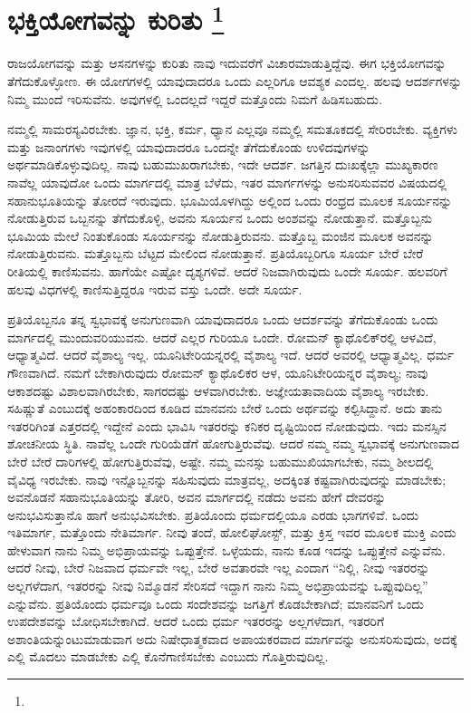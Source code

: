 
\chapter[ಭಕ್ತಿಯೋಗವನ್ನು ಕುರಿತು ]{ಭಕ್ತಿಯೋಗವನ್ನು ಕುರಿತು \protect\footnote{}}

ರಾಜಯೋಗವನ್ನು ಮತ್ತು ಆಸನಗಳನ್ನು ಕುರಿತು ನಾವು ಇದುವರೆಗೆ ವಿಚಾರಮಾಡುತ್ತಿದ್ದೆವು. ಈಗ ಭಕ್ತಿಯೋಗವನ್ನು ತೆಗೆದುಕೊಳ್ಳೋಣ. ಈ ಯೋಗಗಳಲ್ಲಿ ಯಾವುದಾದರೂ ಒಂದು ಎಲ್ಲರಿಗೂ ಆವಶ್ಯಕ ಎಂದಲ್ಲ. ಹಲವು ಆದರ್ಶಗಳನ್ನು ನಿಮ್ಮ ಮುಂದೆ ಇರಿಸುವೆನು. ಅವುಗಳಲ್ಲಿ ಒಂದಲ್ಲದೆ ಇದ್ದರೆ ಮತ್ತೊಂದು ನಿಮಗೆ ಹಿಡಿಸಬಹುದು.

\vskip 6pt

ನಮ್ಮಲ್ಲಿ ಸಾಮರಸ್ಯವಿರಬೇಕು. ಜ್ಞಾನ, ಭಕ್ತಿ, ಕರ್ಮ, ಧ್ಯಾನ ಎಲ್ಲವೂ ನಮ್ಮಲ್ಲಿ ಸಮ\break ತೂಕದಲ್ಲಿ ಸೇರಿರಬೇಕು. ವ್ಯಕ್ತಿಗಳು ಮತ್ತು ಜನಾಂಗಗಳು ಇವುಗಳಲ್ಲಿ ಯಾವುದಾದರೂ ಒಂದನ್ನೇ ತೆಗೆದುಕೊಂಡು ಉಳಿದವುಗಳನ್ನು ಅರ್ಥಮಾಡಿಕೊಳ್ಳುವುದಿಲ್ಲ. ನಾವು ಬಹು\break ಮುಖರಾಗಬೇಕು, ಇದೇ ಆದರ್ಶ. ಜಗತ್ತಿನ ದುಃಖಕ್ಕೆಲ್ಲಾ ಮುಖ್ಯಕಾರಣ ನಾವೆಲ್ಲ ಯಾವುದೋ ಒಂದು ಮಾರ್ಗದಲ್ಲಿ ಮಾತ್ರ ಬೆಳೆದು, ಇತರ ಮಾರ್ಗಗಳನ್ನು ಅನುಸರಿಸು\break ವವರ ವಿಷಯದಲ್ಲಿ ಸಹಾನುಭೂತಿಯನ್ನು ತೋರದೆ ಇರುವುದು. ಭೂಮಿಯೊಳಗಿದ್ದು ಅಲ್ಲಿಂದ ಒಂದು ರಂಧ್ರದ ಮೂಲಕ ಸೂರ್ಯನನ್ನು ನೋಡುತ್ತಿರುವ ಒಬ್ಬನನ್ನು ತೆಗೆದುಕೊಳ್ಳಿ, ಅವನು ಸೂರ್ಯನ ಒಂದು ಅಂಶವನ್ನು ನೋಡುತ್ತಾನೆ. ಮತ್ತೊಬ್ಬನು ಭೂಮಿಯ ಮೇಲೆ ನಿಂತುಕೊಂಡು ಸೂರ್ಯನನ್ನು ನೋಡುತ್ತಿರುವನು. ಮತ್ತೊಬ್ಬ ಮಂಜಿನ ಮೂಲಕ ಅವನನ್ನು ನೋಡುತ್ತಿರುವನು. ಮತ್ತೊಬ್ಬನು ಬೆಟ್ಟದ ಮೇಲಿಂದ ನೋಡುತ್ತಾನೆ. ಪ್ರತಿಯೊಬ್ಬರಿಗೂ ಸೂರ್ಯ ಬೇರೆ ಬೇರೆ ರೀತಿಯಲ್ಲಿ ಕಾಣಿಸುವನು. ಹಾಗೆಯೇ ಎಷ್ಟೋ ದೃಶ್ಯಗಳಿವೆ. ಆದರೆ ನಿಜವಾಗಿರುವುದು ಒಂದೇ ಸೂರ್ಯ. ಹಲವರಿಗೆ ಹಲವು ವಿಧಗಳಲ್ಲಿ ಕಾಣಿಸುತ್ತಿದ್ದರೂ ಇರುವ ವಸ್ತು ಒಂದೇ. ಅದೇ ಸೂರ್ಯ.

\vskip 6pt

ಪ್ರತಿಯೊಬ್ಬನೂ ತನ್ನ ಸ್ವಭಾವಕ್ಕೆ ಅನುಗುಣವಾಗಿ ಯಾವುದಾದರೂ ಒಂದು ಆದರ್ಶವನ್ನು ತೆಗೆದುಕೊಂಡು ಒಂದು ಮಾರ್ಗದಲ್ಲಿ ಮುಂದುವರಿಯುವನು. ಆದರೆ ಎಲ್ಲರ ಗುರಿಯೂ ಒಂದೇ. ರೋಮನ್​ ಕ್ಯಾಥೊಲಿಕ್​ರಲ್ಲಿ ಆಳವಿದೆ, ಆಧ್ಯಾತ್ಮವಿದೆ. ಆದರೆ ವೈಶಾಲ್ಯ ಇಲ್ಲ. ಯೂನಿಟೇರಿಯನ್ನರಲ್ಲಿ ವೈಶಾಲ್ಯ ಇದೆ. ಆದರೆ ಅವರಲ್ಲಿ ಆಧ್ಯಾತ್ಮವಿಲ್ಲ. ಧರ್ಮ ಗೌಣವಾಗಿದೆ. ನಮಗೆ ಬೇಕಾಗಿರುವುದು ರೋಮನ್​ ಕ್ಯಾಥೊಲಿಕರ ಆಳ, ಯೂನಿಟೇರಿಯನ್ನರ ವೈಶಾಲ್ಯ; ನಾವು ಆಕಾಶದಷ್ಟು ವಿಶಾಲವಾಗಿರಬೇಕು, ಸಾಗರದಷ್ಟು ಆಳವಾಗಿರಬೇಕು. ಅಜ್ಞೇಯತಾವಾದಿಯ ವೈಶಾಲ್ಯ ಇರಬೇಕು. ಸಹಿಷ್ಣುತೆ ಎಂಬುದಕ್ಕೆ ಅಹಂಕಾರದಿಂದ ಕೂಡಿದ ಮಾನವನು ಬೇರೆ ಒಂದು ಅರ್ಥವನ್ನು ಕಲ್ಪಿಸಿದ್ದಾನೆ. ಅದು ತಾನು ಇತರರಿಗಿಂತ ಎತ್ತರದಲ್ಲಿ ಇದ್ದೇನೆ ಎಂದು ಭಾವಿಸಿ ಇತರರನ್ನು ಕನಿಕರ ದೃಷ್ಟಿಯಿಂದ ನೋಡುವುದು. ಇದು ಮನಸ್ಸಿನ ಶೋಚನೀಯ ಸ್ಥಿತಿ. ನಾವೆಲ್ಲ ಒಂದೇ ಗುರಿಯೆಡೆಗೆ ಹೋಗುತ್ತಿರುವೆವು. ಆದರೆ ನಮ್ಮ ನಮ್ಮ ಸ್ವಭಾವಕ್ಕೆ ಅನುಗುಣವಾದ ಬೇರೆ ಬೇರೆ ದಾರಿಗಳಲ್ಲಿ ಹೋಗುತ್ತಿರುವೆವು, ಅಷ್ಟೇ. ನಮ್ಮ ಮನಸ್ಸು ಬಹುಮುಖಿಯಾಗಬೇಕು, ನಮ್ಮ ಶೀಲದಲ್ಲಿ ವೈವಿಧ್ಯ ಇರಬೇಕು. ನಾವು ಇನ್ನೊಬ್ಬನನ್ನು ಸಹಿಸುವುದು ಮಾತ್ರವಲ್ಲ, ಅದಕ್ಕಿಂತ ಕಷ್ಟವಾಗಿರುವುದನ್ನು ಮಾಡಬೇಕು; ಅವನೊಡನೆ ಸಹಾನುಭೂತಿಯನ್ನು ತೋರಿ, ಅವನ ಮಾರ್ಗದಲ್ಲಿ ನಡೆದು ಅವನು ಹೇಗೆ ದೇವರನ್ನು ಅನುಭವಿಸುತ್ತಾನೊ ಹಾಗೆ ಅನುಭವಿಸಬೇಕು. ಪ್ರತಿಯೊಂದು ಧರ್ಮದಲ್ಲಿಯೂ ಎರಡು ಭಾಗಗಳಿವೆ. ಒಂದು ಇತಿಮಾರ್ಗ, ಮತ್ತೊಂದು ನೇತಿಮಾರ್ಗ. ನೀವು ತಂದೆ, ಹೋಲಿಘೋಸ್ಟ್​, ಮತ್ತು ಕ್ರಿಸ್ತ ಇವರ ಮೂಲಕ ಮುಕ್ತಿ ಎಂದು ಹೇಳುವಾಗ ನಾನು ನಿಮ್ಮ ಅಭಿಪ್ರಾಯವನ್ನು ಒಪ್ಪುತ್ತೇನೆ. ಒಳ್ಳೆಯದು, ನಾನು ಕೂಡ ಇದನ್ನು ಒಪ್ಪುತ್ತೇನೆ ಎನ್ನುವೆನು. ಆದರೆ ನೀವು, ಬೇರೆ ನಿಜವಾದ ಧರ್ಮವೇ ಇಲ್ಲ, ಬೇರೆ ಅವತಾರವೇ ಇಲ್ಲ ಎಂದಾಗ “ನಿಲ್ಲಿ, ನೀವು ಇತರರನ್ನು ಅಲ್ಲಗಳೆದಾಗ, ಇತರರನ್ನು ನೀವು ನಿಮ್ಮೊಡನೆ ಸೇರಿಸದೆ ಇದ್ದಾಗ ನಾನು ನಿಮ್ಮ ಅಭಿಪ್ರಾಯವನ್ನು ಒಪ್ಪುವುದಿಲ್ಲ” ಎನ್ನುವೆನು. ಪ್ರತಿಯೊಂದು ಧರ್ಮವೂ ಒಂದು ಸಂದೇಶವನ್ನು ಜಗತ್ತಿಗೆ ಕೊಡಬೇಕಾಗಿದೆ; ಮಾನವನಿಗೆ ಒಂದು ಉಪದೇಶವನ್ನು ಬೋಧಿಸಬೇಕಾಗಿದೆ. ಆದರೆ ಒಂದು ಧರ್ಮ ಇತರರನ್ನು ಅಲ್ಲಗಳೆದಾಗ, ಇತರರಿಗೆ ಅಶಾಂತಿಯನ್ನುಂಟುಮಾಡುವಾಗ ಅದು ನಿಷೇಧಾತ್ಮಕವಾದ ಅಪಾಯಕರವಾದ ಮಾರ್ಗವನ್ನು ಅನುಸರಿಸುವುದು, ಅದಕ್ಕೆ ಎಲ್ಲಿ ಮೊದಲು ಮಾಡಬೇಕು ಎಲ್ಲಿ ಕೊನೆಗಾಣಿಸಬೇಕು ಎಂಬುದು ಗೊತ್ತಿರುವುದಿಲ್ಲ.

